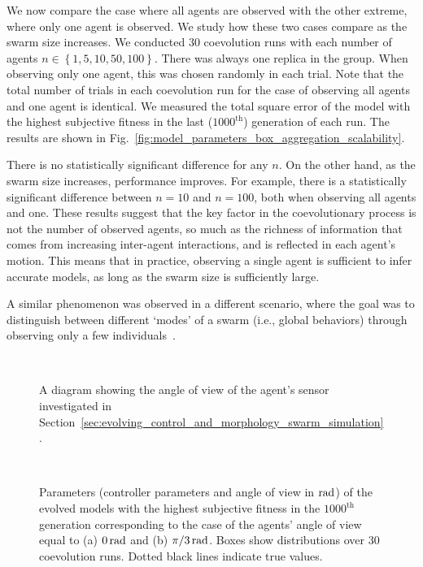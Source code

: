 We now compare the case where all agents are observed with the other extreme, where only one agent is observed. We study how these two cases compare as the swarm size increases. We conducted $30$ coevolution runs with each number of agents $n\in\left\{1, 5, 10, 50, 100\right\}$. There was always one replica in the group. When observing only one agent, this was chosen randomly in each trial. Note that the total number of trials in each coevolution run for the case of observing all agents and one agent is identical. We measured the total square error of the model with the highest subjective fitness in the last ($1000^\textrm{th}$) generation of each run. The results are shown in Fig.~\ref{fig:model_parameters_box_aggregation_scalability}.

There is no statistically significant difference for any $n$. On the other hand, as the swarm size increases, performance improves. For example, there is a statistically significant difference between $n=10$ and $n=100$, both when observing all agents and one. These results suggest that the key factor in the coevolutionary process is not the number of observed agents, so much as the richness of information that comes from increasing inter-agent interactions, and is reflected in each agent's motion. This means that in practice, observing a single agent is sufficient to infer accurate models, as long as the swarm size is sufficiently large.

A similar phenomenon was observed in a different scenario, where the goal was to distinguish between different `modes' of a swarm (i.e., global behaviors) through observing only a few individuals~\cite{Daniel2014}.

\begin{figure}[!t]%
	\centering
		\subfloat[(a) \label{fig:Angle_I=0}]{%
			\texttt{[image: Angle\_I=0.pdf]}
		}\\
		\subfloat[(b) \label{fig:Angle_I=1}]{%
			\texttt{[image: Angle\_I=1.pdf]}
		}
		\caption{A diagram showing the angle of view of the agent's sensor investigated in Section~\ref{sec:evolving_control_and_morphology_swarm_simulation}.}
		\label{fig:Angle_I}
\end{figure}

\begin{figure}[!t]%
	\centering
		\\
		\caption{Parameters (controller parameters and angle of view in $\unit[]{rad}$) of the evolved models with the highest subjective fitness in the $1000^\textrm{th}$ generation corresponding to the case of the agents' angle of view equal to (a) $\unit[0]{rad}$ and (b) $\unit[\pi/3]{rad}$. Boxes show distributions over $30$ coevolution runs. Dotted black lines indicate true values.}
		\label{fig:model_parameters_box_aggregation_angle}
\end{figure}


